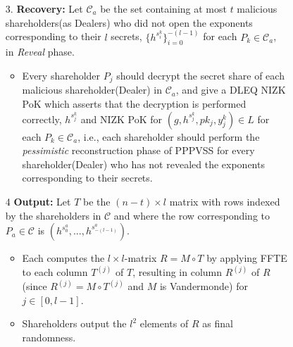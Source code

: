 \begin{figure}[ht]
    \centering
    \begin{tcolorbox}[title=\textbf{Randomness Beacon using PPPVSS (cont.)}, width=0.9\textwidth, colframe=blue!75!black, colback=blue!10, sharp corners]
        \begin{enumerate}
            \item [3.]\textbf{Recovery:} Let $\mathcal{C}_a$ be the set containing at most $t$ malicious shareholders(as Dealers) who did not open the exponents corresponding to their $l$ secrets, $\{h^{s_i^k}\}_{i=0}^{-(l-1)}$ for each $P_k\in\mathcal{C}_a$, in \textit{Reveal} phase.
            \begin{itemize}
                \item Every shareholder $P_j$ should decrypt the secret share of each malicious shareholder(Dealer) in $\mathcal{C}_a$, and give a DLEQ NIZK PoK which asserts that the decryption is performed correctly, $h^{s_j^k}$ and NIZK PoK for $(g, h^{s_j^k}, pk_j, y_j^k)\in L$ for each $P_k\in\mathcal{C}_a$, i.e., each shareholder should perform the \textit{pessimistic} reconstruction phase of PPPVSS for every shareholder(Dealer) who has not revealed the exponents corresponding to their secrets.
            \end{itemize}
            
            \item [4]\textbf{Output:}  Let $T$ be the $(n - t) \times l$ matrix with rows indexed by the shareholders in $\mathcal{C}$ and where the row corresponding to $P_a \in \mathcal{C}$ is $(h^{s_0^a} , . . . , h^{s_{-(l-1)}^a})$.
            \begin{itemize}
                \item Each computes the $l \times l$-matrix $R = M \circ T$ by applying FFTE to each column $T^{(j)}$ of $T$, resulting in column $R^{(j)}$ of $R$ (since $R^{(j)} = M \circ T^{(j)}$ and $M$ is Vandermonde) for $j \in [0, l - 1]$.
                \item Shareholders output the $l^2$ elements of $R$ as final randomness.
            \end{itemize}
        

\end{enumerate}
\end{tcolorbox}
\end{figure}
